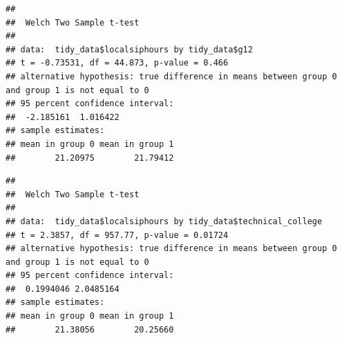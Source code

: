 \documentclass[
  11 pt,
]{article}
\newenvironment{Shaded}{\begin{snugshade}}{\end{snugshade}}
\newcommand{\AttributeTok}[1]{\textcolor[rgb]{0.77,0.63,0.00}{#1}}
\newcommand{\ConstantTok}[1]{\textcolor[rgb]{0.00,0.00,0.00}{#1}}
\newcommand{\FunctionTok}[1]{\textcolor[rgb]{0.00,0.00,0.00}{#1}}
\newcommand{\NormalTok}[1]{#1}
\newcommand{\SpecialCharTok}[1]{\textcolor[rgb]{0.00,0.00,0.00}{#1}}
\begin{document}
\begin{Shaded}
\end{Shaded}

\begin{verbatim}
## 
##  Welch Two Sample t-test
## 
## data:  tidy_data$localsiphours by tidy_data$g12
## t = -0.73531, df = 44.873, p-value = 0.466
## alternative hypothesis: true difference in means between group 0 and group 1 is not equal to 0
## 95 percent confidence interval:
##  -2.185161  1.016422
## sample estimates:
## mean in group 0 mean in group 1 
##        21.20975        21.79412
\end{verbatim}

\begin{Shaded}
\end{Shaded}

\begin{verbatim}
## 
##  Welch Two Sample t-test
## 
## data:  tidy_data$localsiphours by tidy_data$technical_college
## t = 2.3857, df = 957.77, p-value = 0.01724
## alternative hypothesis: true difference in means between group 0 and group 1 is not equal to 0
## 95 percent confidence interval:
##  0.1994046 2.0485164
## sample estimates:
## mean in group 0 mean in group 1 
##        21.38056        20.25660
\end{verbatim}

\begin{Shaded}
\end{Shaded}
\end{document}
